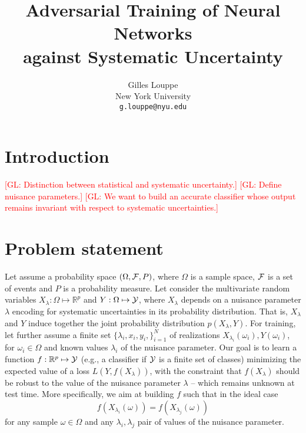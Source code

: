 \documentclass{article}
\title{Adversarial Training of Neural Networks\\
against Systematic Uncertainty}
\author{
  Gilles Louppe \\
  New York University\\
  \texttt{g.louppe@nyu.edu} \\
}
\newcommand{\glnote}[1]{\textcolor{red}{[GL: #1]}}
\theoremstyle{plain}
\begin{document}

\maketitle

\begin{abstract}
\end{abstract}

\section{Introduction}

\glnote{Distinction between statistical and systematic uncertainty.}
\glnote{Define nuisance parameters.}
\glnote{We want to build an accurate classifier whose output remains invariant with
respect to systematic uncertainties.}


\section{Problem statement}
\label{sec:problem}

Let assume a probability space $(\Omega, {\cal F}, P)$, where $\Omega$ is a
sample space, ${\cal F}$ is a set of events and $P$ is a probability measure.
Let consider the multivariate random variables $X_\lambda: \Omega \mapsto \mathbb{R}^p$
and $Y: \Omega \mapsto {\cal Y}$, where $X_\lambda$ depends on a nuisance
parameter $\lambda$ encoding for systematic uncertainties in its probability
distribution. That is, $X_\lambda$ and $Y$ induce together the joint probability
distribution $p(X_\lambda,Y)$. For training, let further assume a finite set $\{
 \lambda_i, x_i, y_i, \}_{i=1}^N$ of realizations $X_{\lambda_i}(\omega_i),
Y(\omega_i)$, for $\omega_i \in \Omega$ and known values $\lambda_i$ of the
nuisance parameter. Our goal is to learn a function $f : \mathbb{R}^p \mapsto
{\cal Y}$ (e.g., a classifier if ${\cal Y}$ is a finite set of classes)
minimizing the expected value of a loss $L(Y, f(X_{\lambda}))$, with the constraint that
$f(X_\lambda)$ should be robust to the value of the nuisance parameter
$\lambda$ -- which remains unknown at test time. More specifically, we aim at building $f$ such that in the ideal case
\begin{equation}\label{eqn1}
f(X_{\lambda_i}(\omega)) = f(X_{\lambda_j}(\omega))
\end{equation}
for any sample $\omega \in
\Omega$ and any $\lambda_i, \lambda_j$ pair of values of the nuisance parameter.
\end{document}
